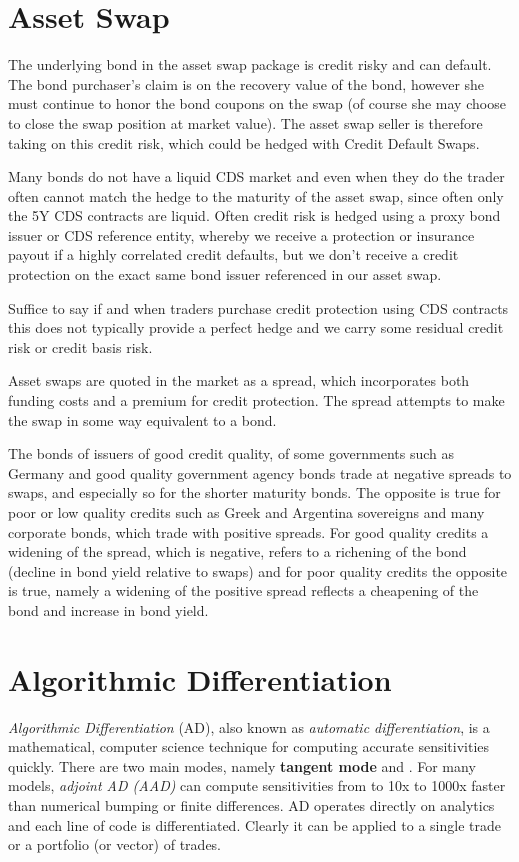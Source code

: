 \documentclass[12pt,a4paper]{book}
\begin{document}
\section{Asset Swap}

The underlying bond in the asset swap package is credit risky and can default. The bond purchaser’s claim is on the recovery value of the bond, however she must continue to honor the bond coupons on the swap (of course she may choose to close the swap position at market value). The asset swap seller is therefore taking on this credit risk, which could be hedged with Credit Default Swaps.

Many bonds do not have a liquid CDS market and even when they do the trader often cannot match the hedge to the maturity of the asset swap, since often only the 5Y CDS contracts are liquid. Often credit risk is hedged using a proxy bond issuer or CDS reference entity, whereby we receive a protection or insurance payout if a highly correlated credit defaults, but we don’t receive a credit protection on the exact same bond issuer referenced in our asset swap.

Suffice to say if and when traders purchase credit protection using CDS contracts this does not typically provide a perfect hedge and we carry some residual credit risk or credit basis risk.

Asset swaps are quoted in the market as a spread, which incorporates both funding costs and a premium for credit protection. The spread attempts to make the swap in some way equivalent to a bond.

The bonds of issuers of good credit quality, of some governments such as Germany and good quality government agency bonds trade at negative spreads to swaps, and especially so for the shorter maturity bonds. The opposite is true for poor or low quality credits such as Greek and Argentina sovereigns and many corporate bonds, which trade with positive spreads. For good quality credits a widening of the spread, which is negative, refers to a richening of the bond (decline in bond yield relative to swaps) and for poor quality credits the opposite is true, namely a widening of the positive spread reflects a cheapening of the bond and increase in bond yield.

\section{Algorithmic Differentiation}
\emph{Algorithmic Differentiation} (AD), also known as \emph{automatic differentiation}, is a mathematical, computer science technique for computing accurate sensitivities quickly. There are two main modes, namely \textbf{tangent mode} and . For many models, \emph{adjoint AD (AAD)} can compute sensitivities from to 10x to 1000x faster than numerical bumping or finite differences. AD operates directly on analytics and each line of code is differentiated. Clearly it can be applied to a single trade or a portfolio (or vector) of trades.
\end{document}
